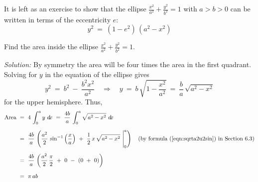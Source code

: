 It is left as an exercise to show that the ellipse
$\frac{x^2}{a^2} + \frac{y^2}{b^2} = 1$ with $a>b>0$ can be written in terms of
the eccentricity $e$:
\begin{equation}\label{eqn:ellipe}
y^2 ~=~ (1 - e^2)\,(a^2 - x^2)
\end{equation}
\newpage
\begin{exmp}\label{exmp:elliparea}
\noindent Find the area inside the ellipse
$\frac{x^2}{a^2} + \frac{y^2}{b^2} = 1$.\vspace{1mm}
\par\noindent\emph{Solution:} By symmetry the
area will be four times the area in the first quadrant. Solving for $y$ in the
equation of the ellipse gives
\[
y^2 ~=~ b^2 ~-~ \frac{b^2 x^2}{a^2} \quad\Rightarrow\quad
y ~=~ b\,\sqrt{1 - \frac{x^2}{a^2}} ~=~ \frac{b}{a}\,\sqrt{a^2 - x^2}
\]
for the upper hemisphere. Thus,
\begin{align*}
\text{Area} ~&=~ 4\,\int_0^a y~d\!x ~=~ \frac{4b}{a}\,\int_0^a \sqrt{a^2 - x^2}~d\!x\\[6pt]
&=~ \frac{4b}{a}\,\left(\frac{a^2}{2}\,\sin^{-1} \left(\frac{x}{a}\right) ~+~
 \frac{1}{2}\,x\,\sqrt{a^2 - x^2} ~\Biggr|_0^a\right)
 \quad\text{(by formula (\ref{eqn:sqrta2u2sin}) in Section 6.3)}\\[6pt]
&=~\frac{4b}{a}\,\left(\frac{a^2}{2}\,\frac{\pi}{2} ~+~ 0 ~-~ (0 ~+~ 0)\right)\\[6pt]
&=~ \pi\,ab
\end{align*}
\end{exmp}\vspace{-3mm}
\divider
\vspace{2mm}

